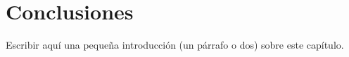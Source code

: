 \chapter{Conclusiones}
\label{chap:07conc}

Escribir aquí una pequeña introducción (un párrafo o dos) sobre este capítulo.
